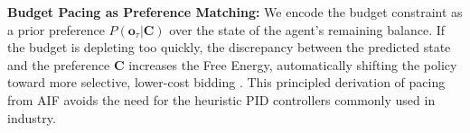 \textbf{Budget Pacing as Preference Matching:} We encode the budget constraint as a prior preference $P(\mathbf{o}_\tau | \mathbf{C})$ over the state of the agent's remaining balance. If the budget is depleting too quickly, the discrepancy between the predicted state and the preference $\mathbf{C}$ increases the Free Energy, automatically shifting the policy toward more selective, lower-cost bidding \cite{ref_new_AFieldGuideforP}. This principled derivation of pacing from AIF avoids the need for the heuristic PID controllers commonly used in industry.